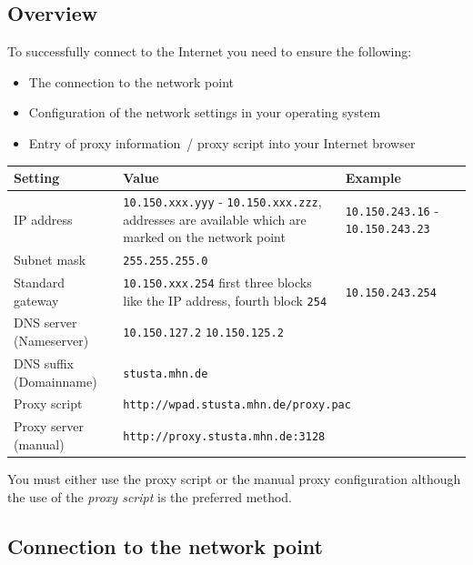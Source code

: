 \documentclass[a4paper,12pt]{scrartcl}
\begin{document}
\subsection*{Overview}

To successfully connect to the Internet you need to ensure the following:
\begin{itemize}
    \item The connection to the network point
    \item Configuration of the network settings in your operating system
    \item Entry of proxy information~/ proxy script into your Internet browser
\end{itemize}


\begin{center}
  \begin{tabularx}{\linewidth}{|lXp{.2\linewidth}|}
    \hline
    Setting & Value & Example \\
    \hline \hline
    IP address & \nolinkurl{10.150.xxx.yyy} - \nolinkurl{10.150.xxx.zzz}, \newline 8 addresses are available which are marked on the network point & \nolinkurl{10.150.243.16} - \nolinkurl{10.150.243.23} \\
    \hline
    Subnet mask & \nolinkurl{255.255.255.0} & \\
    \hline
    Standard gateway & \nolinkurl{10.150.xxx.254} \newline first three blocks like the IP address, fourth block \nolinkurl{254} & \nolinkurl{10.150.243.254} \\
    \hline
    DNS server (Nameserver) & \nolinkurl{10.150.127.2} \newline \nolinkurl{10.150.125.2} & \\
    \hline
    DNS suffix (Domainname) & \nolinkurl{stusta.mhn.de} & \\
    \hline
    Proxy script & \multicolumn{2}{l|}{\nolinkurl{http://wpad.stusta.mhn.de/proxy.pac}} \\
    \hline
    Proxy server (manual) & \multicolumn{2}{l|}{\nolinkurl{http://proxy.stusta.mhn.de:3128}} \\
    \hline
  \end{tabularx}
\end{center}

You must either use the proxy script or the manual proxy configuration although the use of the \emph{proxy script} is the preferred method.

\subsection*{Connection to the network point}
\end{document}
